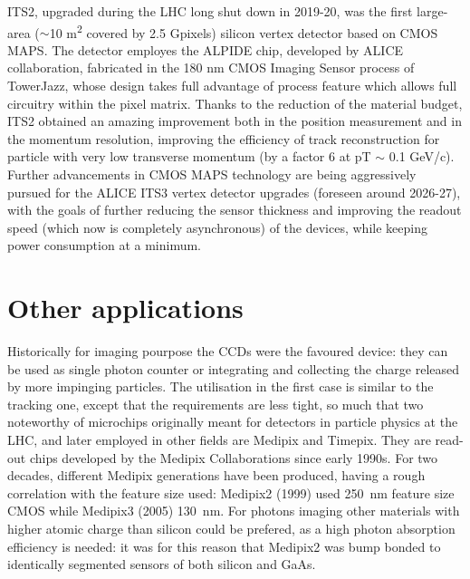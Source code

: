         ITS2, upgraded during the LHC long shut down in 2019-20, was the first large-area ($\sim$10 \si{m\squared} covered by 2.5 Gpixels) silicon vertex detector based on CMOS MAPS.
        The detector employes the ALPIDE chip, developed by ALICE collaboration, fabricated in the 180 nm CMOS Imaging Sensor process of TowerJazz, whose design takes full advantage of process feature which allows full circuitry within the pixel matrix.
        Thanks to the reduction of the material budget, ITS2 obtained an amazing improvement both in the position measurement and in the momentum resolution, improving the efficiency of track reconstruction for particle with very low transverse momentum (by a factor 6 at pT $\sim$ 0.1 GeV/c). Further advancements in CMOS MAPS technology are being aggressively pursued for the ALICE ITS3 vertex detector upgrades (foreseen around 2026-27), with the goals of further reducing the sensor thickness and improving the readout speed (which now is completely asynchronous) of the devices, while keeping power consumption at a minimum.

\section{Other applications}
    Historically for imaging pourpose the CCDs were the favoured device: they can be used as single photon counter or integrating and collecting the charge released by more impinging particles. The utilisation in the first case is similar to the tracking one, except that the requirements are less tight, so much that two noteworthy of microchips originally meant for detectors in particle physics at the LHC, and later employed in other fields are Medipix and Timepix. They are read-out chips developed by the Medipix Collaborations since early 1990s. For two decades, different Medipix generations have been produced, having a rough correlation with the feature size used: Medipix2 (1999) used \SI{250}{nm} feature size CMOS while Medipix3 (2005) \SI{130}{nm}.
    For photons imaging other materials with higher atomic charge than silicon could be prefered, as a high photon absorption efficiency is needed: it was for this reason that Medipix2 was bump bonded to identically segmented sensors of both silicon and GaAs.
    
